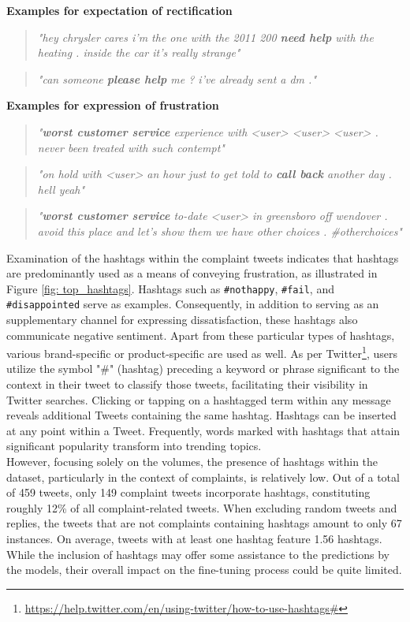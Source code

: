 \textbf{Examples for expectation of rectification}
\begin{quote}
    \textit{"hey chrysler cares i'm the one with the 2011 200 \textbf{need help} with the heating . inside the car it's really strange"}
\end{quote}
\begin{quote}
    \textit{"can someone \textbf{please help} me ? i've already sent a dm ."}
\end{quote}
\textbf{Examples for expression of frustration}
\begin{quote}
    \textit{"\textbf{worst customer service} experience with <user> <user> <user> . never been treated with such contempt"}
\end{quote}
\begin{quote}
    \textit{"on hold with <user> an hour just to get told to \textbf{call back} another day . hell yeah"}
\end{quote}
\begin{quote}
    \textit{"\textbf{worst customer service} to-date <user> in greensboro off wendover . avoid this place and let's show them we have other choices . \#otherchoices"}
\end{quote}

Examination of the hashtags within the complaint tweets indicates that hashtags are predominantly used as a means of conveying frustration, as illustrated in Figure \ref{fig: top_hashtags}. Hashtags such as \texttt{\#nothappy}, \texttt{\#fail}, and \texttt{\#disappointed} serve as examples. Consequently, in addition to serving as an supplementary channel for expressing dissatisfaction, these hashtags also communicate negative sentiment. Apart from these particular types of hashtags, various brand-specific or product-specific are used as well. As per Twitter\footnote{\url{https://help.twitter.com/en/using-twitter/how-to-use-hashtags#}}, users utilize the symbol "\#" (hashtag) preceding a keyword or phrase significant to the context in their tweet to classify those tweets, facilitating their visibility in Twitter searches. Clicking or tapping on a hashtagged term within any message reveals additional Tweets containing the same hashtag. Hashtags can be inserted at any point within a Tweet. Frequently, words marked with hashtags that attain significant popularity transform into trending topics. \\

However, focusing solely on the volumes, the presence of hashtags within the dataset, particularly in the context of complaints, is relatively low. Out of a total of 459 tweets, only 149 complaint tweets incorporate hashtags, constituting roughly 12\% of all complaint-related tweets. When excluding random tweets and replies, the tweets that are not complaints containing hashtags amount to only 67 instances. On average, tweets with at least one hashtag feature 1.56 hashtags. While the inclusion of hashtags may offer some assistance to the predictions by the models, their overall impact on the fine-tuning process could be quite limited.\\

